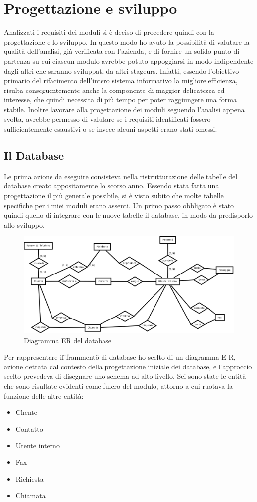 \section{Progettazione e sviluppo}
Analizzati i requisiti dei moduli si \`e deciso di procedere quindi con la progettazione e lo sviluppo. In questo modo ho avuto 
la possibilit\`a di valutare la qualit\`a dell'analisi, gi\`a verificata con l'azienda, 
e di fornire un solido punto di partenza su cui ciascun modulo avrebbe potuto appoggiarsi in
modo indipendente dagli altri che saranno sviluppati da altri stageurs. Infatti, essendo l'obiettivo primario del rifacimento 
dell'intero sistema informativo la migliore efficienza, risulta conseguentemente anche la componente di
maggior delicatezza ed interesse, che quindi necessita di pi\`u tempo per poter raggiungere una forma stabile. 
Inoltre lavorare alla progettazione dei moduli seguendo l'analisi appena svolta, avrebbe permesso di valutare
se i requisiti identificati fossero sufficientemente esaustivi o se invece alcuni aspetti erano stati omessi.
\subsection{Il Database}
Le prima azione da eseguire consisteva nella ristrutturazione delle tabelle del database creato appositamente lo scorso anno.
Essendo stata fatta una progettazione il pi\`u generale possibile, si \`e visto subito che molte tabelle specifiche per i miei moduli 
erano assenti. Un primo passo obbligato \`e stato quindi quello di integrare con le nuove tabelle il database, in modo da predisporlo 
allo sviluppo.
\begin{figure}[!ht]
\centering
  \includegraphics[scale=0.3]{./images/ER.png}
\caption{Diagramma ER del database}
\end{figure}
 
Per rappresentare il \"{}frammento\"{} di database ho scelto di un diagramma E-R, azione dettata dal contesto della progettazione
 iniziale dei database, e l'approccio scelto prevedeva di disegnare uno schema ad alto livello.
Sei sono state le entità che sono risultate evidenti come fulcro del modulo, attorno a cui ruotava la funzione delle altre entit\`a:
\begin{itemize}
  \item Cliente
  \item Contatto
  \item Utente interno
  \item Fax
  \item Richiesta
  \item Chiamata
\end{itemize}

